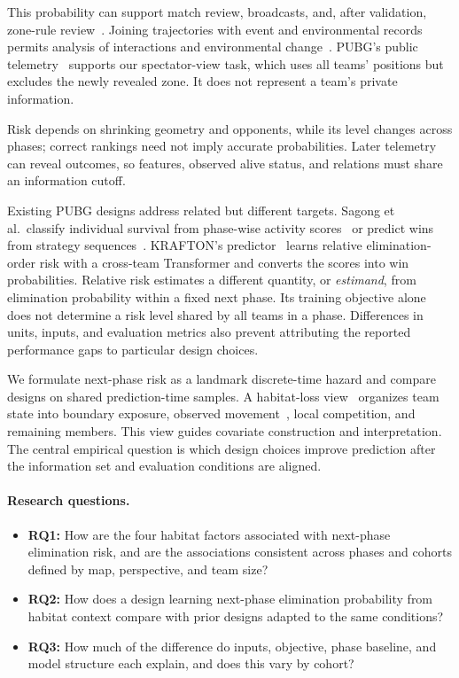 \documentclass[sigconf,anonymous,nonacm]{acmart}
\begin{document}
This probability can support match review, broadcasts, and, after validation, zone-rule review~\cite{PUBGBlueZone2026}. Joining trajectories with event and environmental records permits analysis of interactions and environmental change~\cite{Zheng15}. PUBG's public telemetry~\cite{PUBGAPI} supports our spectator-view task, which uses all teams' positions but excludes the newly revealed zone. It does not represent a team's private information.

Risk depends on shrinking geometry and opponents, while its level changes across phases; correct rankings need not imply accurate probabilities. Later telemetry can reveal outcomes, so features, observed alive status, and relations must share an information cutoff.

Existing PUBG designs address related but different targets. Sagong et al.\ classify individual survival from phase-wise activity scores~\cite{Sagong25a} or predict wins from strategy sequences~\cite{Sagong25b}. KRAFTON's predictor~\cite{KRAFTON} learns relative elimination-order risk with a cross-team Transformer and converts the scores into win probabilities. Relative risk estimates a different quantity, or \emph{estimand}, from elimination probability within a fixed next phase. Its training objective alone does not determine a risk level shared by all teams in a phase. Differences in units, inputs, and evaluation metrics also prevent attributing the reported performance gaps to particular design choices.

We formulate next-phase risk as a landmark discrete-time hazard and compare designs on shared prediction-time samples. A habitat-loss view~\cite{Fahrig03} organizes team state into boundary exposure, observed movement~\cite{Nathan08}, local competition, and remaining members. This view guides covariate construction and interpretation. The central empirical question is which design choices improve prediction after the information set and evaluation conditions are aligned.

\paragraph{Research questions.}
\begin{itemize}
\item \textbf{RQ1:} How are the four habitat factors associated with next-phase elimination risk, and are the associations consistent across phases and cohorts defined by map, perspective, and team size?
\item \textbf{RQ2:} How does a design learning next-phase elimination probability from habitat context compare with prior designs adapted to the same conditions?
\item \textbf{RQ3:} How much of the difference do inputs, objective, phase baseline, and model structure each explain, and does this vary by cohort?
\end{itemize}
\end{document}
